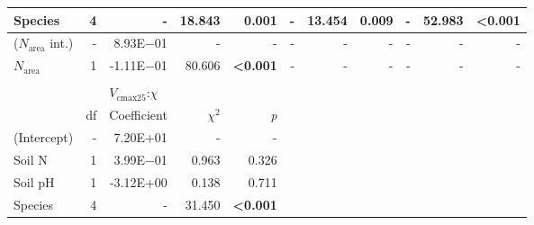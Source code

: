 \begin{landscape}
\begin{table}
{\begin{tabular}{p{2.5cm}p{0.5cm}p{2cm}p{1.5cm}p{1.5cm}p{2cm}p{1.5cm}p{1.5cm}p{2cm}p{1.5cm}p{1.5cm}}
        Species & \multicolumn{1}{r}{4}
        & \multicolumn{1}{r}{-} & \multicolumn{1}{r}{18.843} & \multicolumn{1}{r}{\textbf{0.001}}
        & \multicolumn{1}{r}{-} & \multicolumn{1}{r}{13.454} & \multicolumn{1}{r}{\textbf{0.009}}
        & \multicolumn{1}{r}{-} & \multicolumn{1}{r}{52.983} & \multicolumn{1}{r}{\textbf{<0.001}}
        \\
        \hline

        ($N_\mathrm{area}$ int.) & \multicolumn{1}{r}{-}
        & \multicolumn{1}{r}{8.93E$-$01}  & \multicolumn{1}{r}{-}    & \multicolumn{1}{r}{-}
        & \multicolumn{1}{r}{-}         & \multicolumn{1}{r}{-}    & \multicolumn{1}{r}{-}
        & \multicolumn{1}{r}{-}         & \multicolumn{1}{r}{-}    & \multicolumn{1}{r}{-}
        \\

        $N_\mathrm{area}$ & \multicolumn{1}{r}{1}
        & \multicolumn{1}{r}{-1.11E$-$01} & \multicolumn{1}{r}{80.606}  & \multicolumn{1}{r}{\textbf{<0.001}}
        & \multicolumn{1}{r}{-}         & \multicolumn{1}{r}{-}       & \multicolumn{1}{r}{-}
        & \multicolumn{1}{r}{-}         & \multicolumn{1}{r}{-}       & \multicolumn{1}{r}{-}
        \\
        \hline

        &&&&&&&&&&
        \\

        && \multicolumn{3}{l}{$V_{\mathrm{cmax25}}$:$\chi$} &&&&& \\
        \hline
        & \multicolumn{1}{r}{df}
        & \multicolumn{1}{r}{Coefficient} & \multicolumn{1}{r}{$\chi^{2}$} & \multicolumn{1}{r}{\textit{p}} 
        \\
        \hline

        (Intercept) & \multicolumn{1}{r}{-}
        & \multicolumn{1}{r}{7.20E+01} & \multicolumn{1}{r}{-} & \multicolumn{1}{r}{-}
        &&&&&&
        \\

        Soil N & \multicolumn{1}{r}{1}
        & \multicolumn{1}{r}{3.99E$-$01}  & \multicolumn{1}{r}{0.963} & \multicolumn{1}{r}{0.326}
        &&&&&& 
        \\

        Soil pH & \multicolumn{1}{r}{1}
        & \multicolumn{1}{r}{-3.12E+00} & \multicolumn{1}{r}{0.138} & \multicolumn{1}{r}{0.711}
        &&&&&& 
        \\

        Species & \multicolumn{1}{r}{4}
        & \multicolumn{1}{r}{-} & \multicolumn{1}{r}{31.450} & \multicolumn{1}{r}{\textbf{<0.001}}
        \\
        \hline


\end{tabular}}
\end{table}
\end{landscape}
